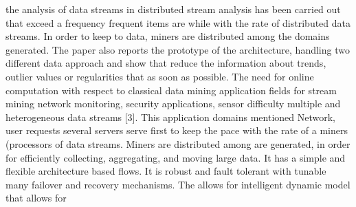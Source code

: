 \documentclass[times]{cpeauth}
\begin{document}
the analysis of data streams in distributed %
stream analysis has been carried out %
that exceed a frequency %
frequent items are %
while %
with the rate of distributed data streams. In order to keep %
to data, miners are distributed among the domains %
generated. The paper also reports the %
prototype of the architecture, %
handling two different data %
approach and show that %
reduce the %
%
information about trends, outlier values or regularities that %
as soon as possible.  The need for online computation %
with respect to classical data mining %
application fields for stream mining %
network monitoring, security %
applications, sensor %
difficulty %
multiple and heterogeneous data streams [3]. This %
application domains mentioned %
Network, user requests %
several servers %
serve %
%
first to keep the pace with the rate of a %
miners (processors %
of data streams. Miners are distributed among %
are generated, in order %
%
%
%
for efficiently collecting, aggregating, and moving large %
data. It has a simple and flexible architecture based %
flows. It is robust and fault tolerant with tunable %
many failover and recovery mechanisms. The %
allows for intelligent dynamic %
model that allows for %
\end{document}
